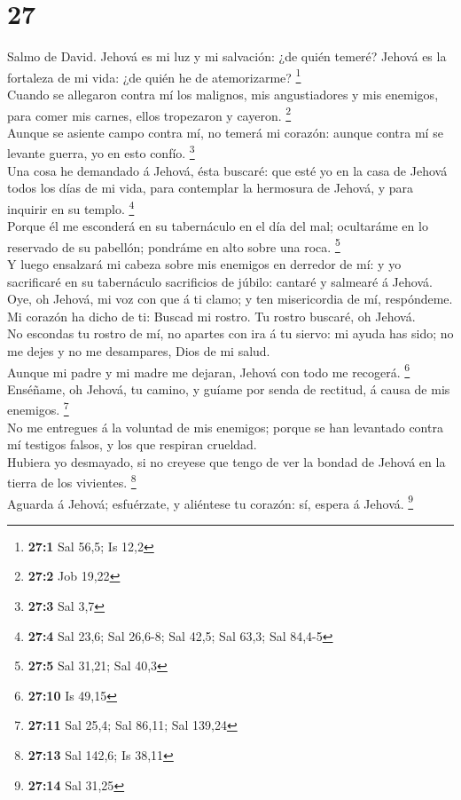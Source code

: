 \hypertarget{section-26}{%
\section{27}\label{section-26}}

 Salmo de David. Jehová es mi luz y mi salvación: ¿de
quién temeré? Jehová es la fortaleza de mi vida: ¿de quién he de
atemorizarme? \footnote{\textbf{27:1} Sal 56,5; Is 12,2}\\
 Cuando se allegaron contra mí los malignos, mis
angustiadores y mis enemigos, para comer mis carnes, ellos tropezaron y
cayeron. \footnote{\textbf{27:2} Job 19,22}\\
 Aunque se asiente campo contra mí, no temerá mi corazón:
aunque contra mí se levante guerra, yo en esto confío. \footnote{\textbf{27:3}
  Sal 3,7}\\
 Una cosa he demandado á Jehová, ésta buscaré: que esté yo
en la casa de Jehová todos los días de mi vida, para contemplar la
hermosura de Jehová, y para inquirir en su templo. \footnote{\textbf{27:4}
  Sal 23,6; Sal 26,6-8; Sal 42,5; Sal 63,3; Sal 84,4-5}\\
 Porque él me esconderá en su tabernáculo en el día del
mal; ocultaráme en lo reservado de su pabellón; pondráme en alto sobre
una roca. \footnote{\textbf{27:5} Sal 31,21; Sal 40,3}\\
 Y luego ensalzará mi cabeza sobre mis enemigos en
derredor de mí: y yo sacrificaré en su tabernáculo sacrificios de
júbilo: cantaré y salmearé á Jehová.\\
 Oye, oh Jehová, mi voz con que á ti clamo; y ten
misericordia de mí, respóndeme.\\
 Mi corazón ha dicho de ti: Buscad mi rostro. Tu rostro
buscaré, oh Jehová.\\
 No escondas tu rostro de mí, no apartes con ira á tu
siervo: mi ayuda has sido; no me dejes y no me desampares, Dios de mi
salud.\\
 Aunque mi padre y mi madre me dejaran, Jehová con todo
me recogerá. \footnote{\textbf{27:10} Is 49,15}\\
 Enséñame, oh Jehová, tu camino, y guíame por senda de
rectitud, á causa de mis enemigos. \footnote{\textbf{27:11} Sal 25,4;
  Sal 86,11; Sal 139,24}\\
 No me entregues á la voluntad de mis enemigos; porque se
han levantado contra mí testigos falsos, y los que respiran crueldad.\\
 Hubiera yo desmayado, si no creyese que tengo de ver la
bondad de Jehová en la tierra de los vivientes. \footnote{\textbf{27:13}
  Sal 142,6; Is 38,11}\\
 Aguarda á Jehová; esfuérzate, y aliéntese tu corazón:
sí, espera á Jehová. \footnote{\textbf{27:14} Sal 31,25}

